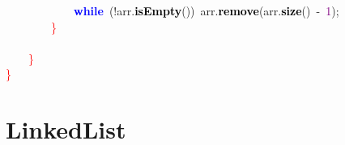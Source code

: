 \mbox{}\ \ \ \ \ \ \ \ \ \ \ \ \textbf{\textcolor{Blue}{while}}\ \textcolor{BrickRed}{(!}arr\textcolor{BrickRed}{.}\textbf{\textcolor{Black}{isEmpty}}\textcolor{BrickRed}{())}\ arr\textcolor{BrickRed}{.}\textbf{\textcolor{Black}{remove}}\textcolor{BrickRed}{(}arr\textcolor{BrickRed}{.}\textbf{\textcolor{Black}{size}}\textcolor{BrickRed}{()}\ \textcolor{BrickRed}{-}\ \textcolor{Purple}{1}\textcolor{BrickRed}{);} \\
\mbox{}\ \ \ \ \ \ \ \ \textcolor{Red}{\}} \\
\mbox{} \\
\mbox{}\ \ \ \ \textcolor{Red}{\}} \\
\mbox{}\textcolor{Red}{\}} \\
\mbox{}

\section{LinkedList}
